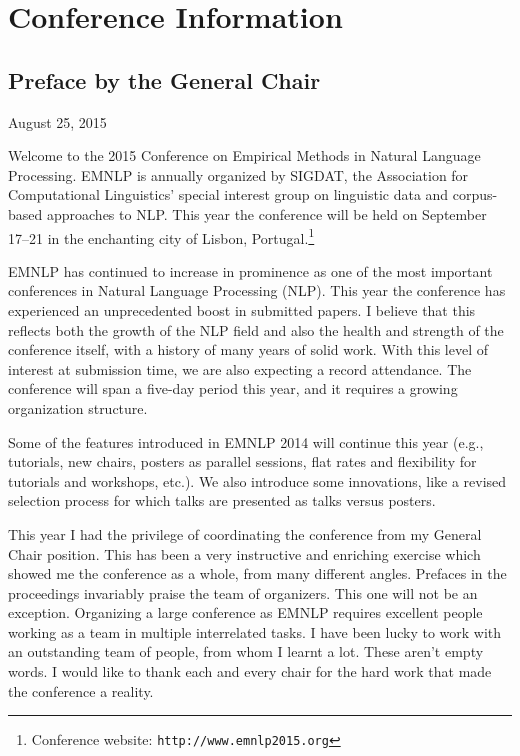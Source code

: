 
\chapter{Conference Information}


\section{Preface by the General Chair}

\begin{flushright}
August 25, 2015 
\par\end{flushright}

\noindent Welcome to the 2015 Conference on Empirical Methods in Natural
Language Processing. EMNLP is annually organized by SIGDAT, the Association
for Computational Linguistics' special interest group on linguistic
data and corpus-based approaches to NLP. This year the conference
will be held on September 17--21 in the enchanting city of Lisbon,
Portugal.\footnote{Conference website: \texttt{http://www.emnlp2015.org}}

EMNLP has continued to increase in prominence as one of the most important
conferences in Natural Language Processing (NLP). This year the conference
has experienced an unprecedented boost in submitted papers. I believe
that this reflects both the growth of the NLP field and also the health
and strength of the conference itself, with a history of many years
of solid work. With this level of interest at submission time, we
are also expecting a record attendance. The conference will span a
five-day period this year, and it requires a growing organization
structure.

Some of the features introduced in EMNLP 2014 will continue this year
(e.g., tutorials, new chairs, posters as parallel sessions, flat rates
and flexibility for tutorials and workshops, etc.). We also introduce
some innovations, like a revised selection process for which talks
are presented as talks versus posters.

This year I had the privilege of coordinating the conference from
my General Chair position. This has been a very instructive and enriching
exercise which showed me the conference as a whole, from many different
angles. Prefaces in the proceedings invariably praise the team of
organizers. This one will not be an exception. Organizing a large
conference as EMNLP requires excellent people working as a team in
multiple interrelated tasks. I have been lucky to work with an outstanding
team of people, from whom I learnt a lot. These aren't empty words.
I would like to thank each and every chair for the hard work that
made the conference a reality.

